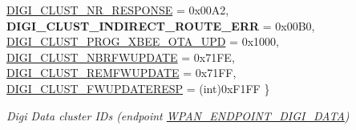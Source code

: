 \begin{DoxyCompactItemize}
\newline
\hyperlink{group__wpan__aps_gga1227ab13b41d82d9c9c9080662f74cf7a29b2b3f9713deb027140197f2ef499fa}{D\+I\+G\+I\+\_\+\+C\+L\+U\+S\+T\+\_\+\+N\+R\+\_\+\+R\+E\+S\+P\+O\+N\+SE} = 0x00\+A2, 
{\bfseries D\+I\+G\+I\+\_\+\+C\+L\+U\+S\+T\+\_\+\+I\+N\+D\+I\+R\+E\+C\+T\+\_\+\+R\+O\+U\+T\+E\+\_\+\+E\+RR} = 0x00\+B0, 
\hyperlink{group__wpan__aps_gga1227ab13b41d82d9c9c9080662f74cf7aedb825ada66b8c7bbfbeaee6d9dfba0a}{D\+I\+G\+I\+\_\+\+C\+L\+U\+S\+T\+\_\+\+P\+R\+O\+G\+\_\+\+X\+B\+E\+E\+\_\+\+O\+T\+A\+\_\+\+U\+PD} = 0x1000, 
\hyperlink{group__wpan__aps_gga1227ab13b41d82d9c9c9080662f74cf7a95c58dbf91ce9b915abdc1fdbc236ebe}{D\+I\+G\+I\+\_\+\+C\+L\+U\+S\+T\+\_\+\+N\+B\+R\+F\+W\+U\+P\+D\+A\+TE} = 0x71\+FE, 
\newline
\hyperlink{group__wpan__aps_gga1227ab13b41d82d9c9c9080662f74cf7a378e1e715bf4f25284c4739dccdc8c79}{D\+I\+G\+I\+\_\+\+C\+L\+U\+S\+T\+\_\+\+R\+E\+M\+F\+W\+U\+P\+D\+A\+TE} = 0x71\+FF, 
\hyperlink{group__wpan__aps_gga1227ab13b41d82d9c9c9080662f74cf7abc3b7a2d5a20c8f541dce60eb523694f}{D\+I\+G\+I\+\_\+\+C\+L\+U\+S\+T\+\_\+\+F\+W\+U\+P\+D\+A\+T\+E\+R\+E\+SP} = (int)0x\+F1\+FF
 \}\begin{DoxyCompactList}\small\item\em Digi Data cluster I\+Ds (endpoint \hyperlink{group__wpan__aps_ga83cb85a2a1e374554f9ad735c9c06e7b}{W\+P\+A\+N\+\_\+\+E\+N\+D\+P\+O\+I\+N\+T\+\_\+\+D\+I\+G\+I\+\_\+\+D\+A\+TA}) \end{DoxyCompactList}
\end{DoxyCompactItemize}
